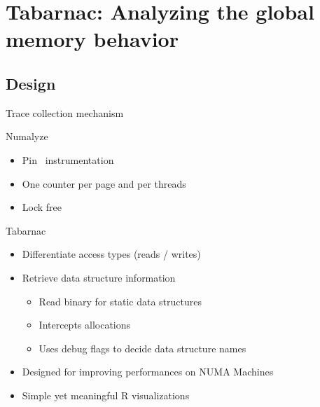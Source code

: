 \documentclass[xcolor={usenames,dvipsnames},hyperref={pdfusetitle}]{beamer}
\begin{document}
\section{Tabarnac: Analyzing the global memory behavior}

\subsection{Design}

\begin{frame}{Trace collection mechanism}
    \begin{block}{Numalyze~\cite{Diener15Characterizing}}
        \begin{itemize}
            \item Pin~\cite{Luk05Pin} instrumentation
            \item One counter per page and per threads
            \item Lock free
        \end{itemize}
    \end{block}
    \pause
    \begin{alertblock}{Tabarnac}
        \begin{itemize}[<+->]
            \item Differentiate access types (reads / writes)
            \item Retrieve data structure information
                \begin{itemize}
                    \item Read binary for static data structures
                    \item Intercepts allocations
                    \item Uses debug flags to decide data structure names
                \end{itemize}
            \item Designed for improving performances on NUMA Machines
            \item Simple yet meaningful R visualizations
        \end{itemize}
    \end{alertblock}
\end{frame}
\end{document}

